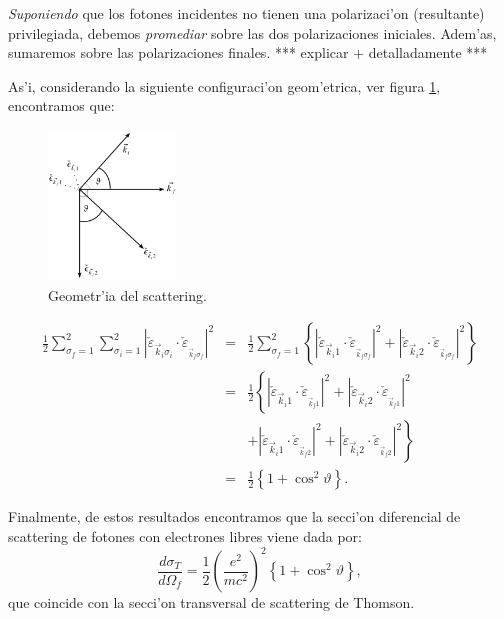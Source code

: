 \textit{Suponiendo} que los fotones incidentes no tienen una polarizaci'on
(resultante) privilegiada, debemos \textit{promediar} sobre las dos
polarizaciones iniciales. Adem'as, sumaremos sobre las polarizaciones finales. 
*** explicar + detalladamente ***

As'i, considerando la siguiente configuraci'on geom'etrica, ver figura
\ref{geomscat}, encontramos que:
\begin{figure}[ht]
\begin{center}
	\includegraphics[height=4cm]{figs/fig-kikf.pdf}
	\caption{Geometr'ia del scattering.}
   \label{geomscat}
\end{center}
\end{figure}
\begin{eqnarray}
\frac{1}{2}\sum_{\sigma_f=1}^2\sum_{\sigma_i=1}^2\left|
\check{\varepsilon}_{\vec{k}_i\sigma_i}\cdot\check{\varepsilon}_{_{\vec
{k}_f\sigma_f}}\right|^2 & = &\frac{1}{2}\sum_{\sigma_f=1}%
^2\left\{ \left| \check{\varepsilon}_{\vec{k}_i1}\cdot\check
{\varepsilon}_{_{\vec{k}_f\sigma_f}}\right|^2+\left|
\check{\varepsilon}_{\vec{k}_i2}\cdot\check{\varepsilon}_{_{\vec{k}%
_f\sigma_f}}\right|^2\right\} \\
& = &\frac{1}{2}\left\{ \left| \check{\varepsilon}_{\vec{k}_i1}%
\cdot\check{\varepsilon}_{_{\vec{k}_f1}}\right|^2+\left|
\check{\varepsilon}_{\vec{k}_i2}\cdot\check{\varepsilon}_{_{\vec{k}_f1}%
}\right|^2\right. \nonumber\\
&&\left.+\left| \check{\varepsilon}_{\vec{k}_i1}\cdot
\check{\varepsilon}_{_{\vec{k}_f2}}\right|^2+\left|
\check{\varepsilon}_{\vec{k}_i2}\cdot\check{\varepsilon}_{_{\vec{k}_f2}%
}\right|^2\right\} \\
& = &\frac{1}{2}\left\{ 1+\cos^2\vartheta\right\} .
\end{eqnarray}


Finalmente, de estos resultados encontramos que la secci'on diferencial de
scattering de fotones con
electrones libres viene dada por:
\begin{equation}
\frac{d\sigma_{T}}{d\Omega_f}=\frac{1}{2}\left( \frac{e^2}{mc^2%
}\right)^2\left\{ 1+\cos^2\vartheta\right\}
,\label{Seccion diferencial 1}%
\end{equation}
que coincide con la secci'on transversal de scattering de Thomson.

